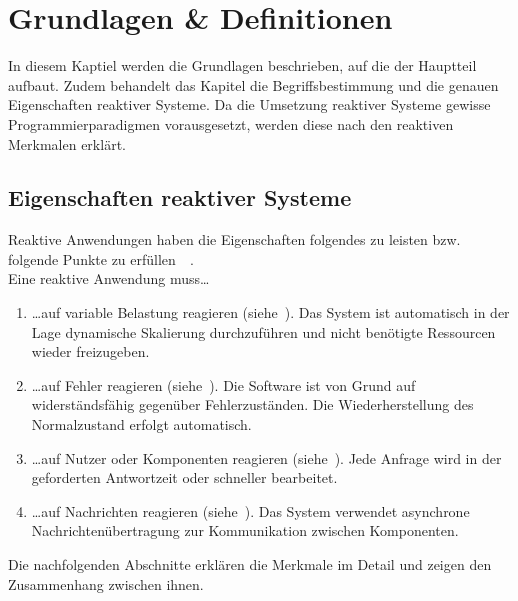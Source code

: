 \chapter{Grundlagen \& Definitionen}
In diesem Kaptiel werden die Grundlagen beschrieben, auf die der Hauptteil aufbaut. Zudem behandelt das Kapitel die Begriffsbestimmung und die genauen Eigenschaften reaktiver Systeme. Da die Umsetzung reaktiver Systeme gewisse Programmierparadigmen vorausgesetzt, werden diese nach den reaktiven Merkmalen erklärt.

\section{Eigenschaften reaktiver Systeme}
Reaktive Anwendungen haben die Eigenschaften folgendes zu leisten bzw. folgende Punkte zu erfüllen~\cite[S.~19ff]{kuhn_reactive_2015}~\cite[S.~6]{vernon_reactive_2016}.\\
Eine reaktive Anwendung muss\ldots
\begin{enumerate}
\item \ldots auf variable Belastung reagieren (siehe~). Das System ist automatisch in der Lage dynamische Skalierung durchzuführen und nicht benötigte Ressourcen wieder freizugeben.
\item \ldots auf Fehler reagieren (siehe~). Die Software ist von Grund auf widerständsfähig gegenüber Fehlerzuständen. Die Wiederherstellung des Normalzustand erfolgt automatisch.
\item \ldots auf Nutzer oder Komponenten reagieren (siehe~). Jede Anfrage wird in der geforderten Antwortzeit oder schneller bearbeitet.
\item \ldots auf Nachrichten reagieren (siehe~). Das System verwendet asynchrone Nachrichtenübertragung zur Kommunikation zwischen Komponenten.
\end{enumerate}

Die nachfolgenden Abschnitte erklären die Merkmale im Detail und zeigen den Zusammenhang zwischen ihnen.

